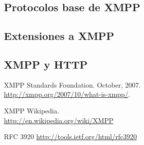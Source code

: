 \documentclass[a4paper, 11pt]{article} %
\begin{document}
  \subsection{Protocolos base de XMPP}
  \subsection{Extensiones a XMPP}
  \subsection{XMPP y HTTP}
  
  

  
\vfill
\begin{thebibliography}{9}

  XMPP Standards Foundation. October, 2007.\\
  \url{http://xmpp.org/2007/10/what-is-xmpp/}.
  
  XMPP Wikipedia.\\
  \url{http://en.wikipedia.org/wiki/XMPP}
  
  RFC 3920
  \url{http://tools.ietf.org/html/rfc3920}
\end{thebibliography}  
  
\end{document}
